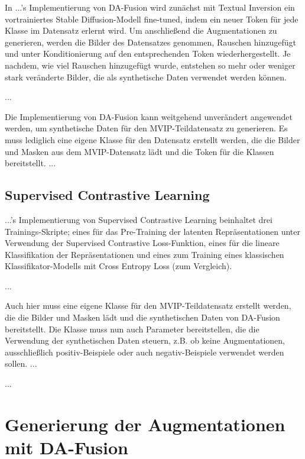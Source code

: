 In ...'s Implementierung von DA-Fusion wird zunächst mit Textual Inversion ein vortrainiertes Stable Diffusion-Modell fine-tuned, indem ein neuer Token für jede Klasse im Datensatz erlernt wird. Um anschließend die Augmentationen zu generieren, werden die Bilder des Datensatzes genommen, Rauschen hinzugefügt und unter Konditionierung auf den entsprechenden Token wiederhergestellt. Je nachdem, wie viel Rauschen hinzugefügt wurde, entstehen so mehr oder weniger stark veränderte Bilder, die als synthetische Daten verwendet werden können.

...

Die Implementierung von DA-Fusion kann weitgehend unverändert angewendet werden, um synthetische Daten für den MVIP-Teildatensatz zu generieren. Es muss lediglich eine eigene Klasse für den Datensatz erstellt werden, die die Bilder und Masken aus dem MVIP-Datensatz lädt und die Token für die Klassen bereitstellt. ...

\subsection{Supervised Contrastive Learning} \label{sec:impl-supcon}


...'s Implementierung von Supervised Contrastive Learning beinhaltet drei Trainings-Skripte; eines für das Pre-Training der latenten Repräsentationen unter Verwendung der Supervised Contrastive Loss-Funktion, eines für die lineare Klassifikation der Repräsentationen und eines zum Training eines klassischen Klassifikator-Modells mit Cross Entropy Loss (zum Vergleich).

...

Auch hier muss eine eigene Klasse für den MVIP-Teildatensatz erstellt werden, die die Bilder und Masken lädt und die synthetischen Daten von DA-Fusion bereitstellt. Die Klasse muss nun auch Parameter bereitstellen, die die Verwendung der synthetischen Daten steuern, z.B. ob keine Augmentationen, ausschließlich positiv-Beispiele oder auch negativ-Beispiele verwendet werden sollen. ...

...

\section{Generierung der Augmentationen mit DA-Fusion} \label{sec:synt-gen-da-fusion}

